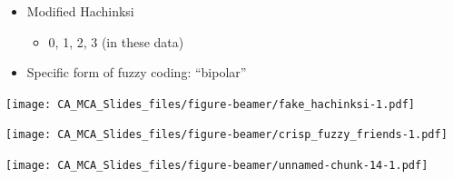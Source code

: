 \documentclass[
  ignorenonframetext,
]{beamer}
\providecommand{\tightlist}{%
  \setlength{\itemsep}{0pt}\setlength{\parskip}{0pt}}
\begin{document}
\begin{frame}

\begin{itemize}[<+->]
\tightlist
\item
  Modified Hachinksi

  \begin{itemize}[<+->]
  \tightlist
  \item
    0, 1, 2, 3 (in these data)
  \end{itemize}
\item
  Specific form of fuzzy coding: ``bipolar''
\end{itemize}

\end{frame}

\begin{frame}

\texttt{[image: CA\_MCA\_Slides\_files/figure-beamer/fake\_hachinksi-1.pdf]}

\end{frame}

\begin{frame}

\texttt{[image: CA\_MCA\_Slides\_files/figure-beamer/crisp\_fuzzy\_friends-1.pdf]}

\end{frame}

\begin{frame}

\texttt{[image: CA\_MCA\_Slides\_files/figure-beamer/unnamed-chunk-14-1.pdf]}

\end{frame}
\end{document}
